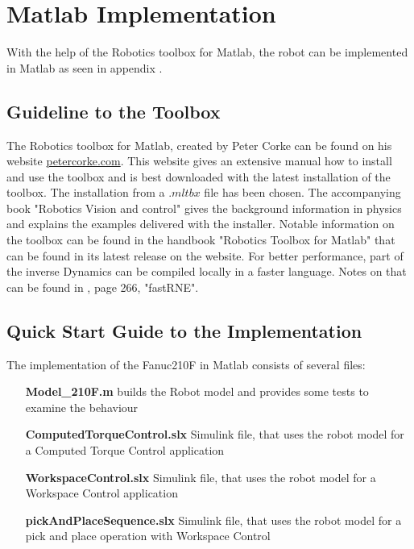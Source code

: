 \section{Matlab Implementation}

With the help of the Robotics toolbox for Matlab, the robot can be implemented in Matlab as seen in appendix .

\subsection{Guideline to the Toolbox}

The Robotics toolbox for Matlab, created by Peter Corke can be found on his website \url{petercorke.com}. This website gives an extensive manual how to install and use the toolbox and is best downloaded with the latest installation of the toolbox. The installation from a $.mltbx$ file has been chosen. 
The accompanying book "Robotics Vision and control" gives the background information in physics and explains the examples delivered with the installer. Notable information on the toolbox can be found in the handbook "Robotics Toolbox for Matlab" that can be found in its latest release on the website.
For better performance, part of the inverse Dynamics can be compiled locally in a faster language. Notes on that can be found in \cite{CorkeRoboticVisionControl}, page 266, "fastRNE".

\subsection{Quick Start Guide to the Implementation}
The implementation of the Fanuc210F in Matlab consists of several files:\\
\begin{itemize}[wide=\parindent]
	\item[\textbf{Model_210F.m}] builds the Robot model and provides some tests to examine the behaviour
	\item[\textbf{ComputedTorqueControl.slx}] Simulink file, that uses the robot model for a Computed Torque Control application
	\item[\textbf{WorkspaceControl.slx}] Simulink file, that uses the robot model for a Workspace Control application
	\item[\textbf{pickAndPlaceSequence.slx}] Simulink file, that uses the robot model for a pick and place operation with Workspace Control
\end{itemize}

